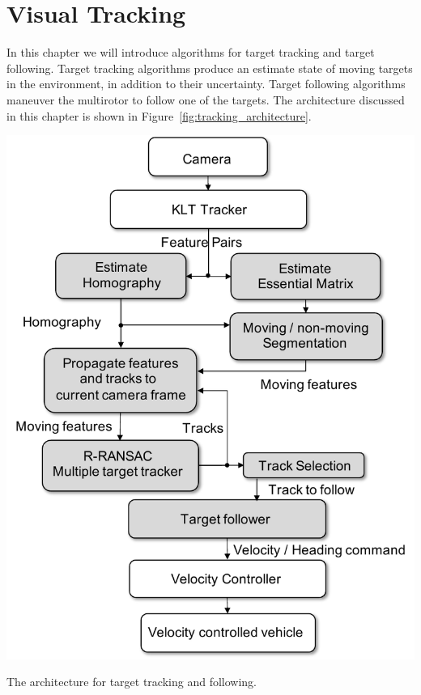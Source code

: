 
\chapter{Visual Tracking}
\label{chap:tracking}

In this chapter we will introduce algorithms for target tracking and target following.  Target tracking algorithms produce an estimate state of moving targets in the environment, in addition to their uncertainty.  Target following algorithms maneuver the multirotor to follow one of the targets.  The architecture discussed in this chapter is shown in Figure~\ref{fig:tracking_architecture}.
\begin{marginfigure}
	\includegraphics[width=\linewidth]{chap10_tracking/figures/tracking_architecture.pdf} 
	\caption{The architecture for target tracking and following.}
	\label{fig:tracking_architecture}
\end{marginfigure}
